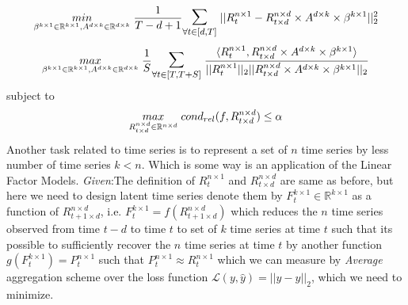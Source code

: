 \begin{equation} \label{lfm_loss}
\underset{\beta^{k \times 1}\in \mathbb{R}^{k\times 1}, A^{d\times k} \in \mathbb{R}^{d\times k}}{min}\hspace{1mm} \frac{1}{T-d+1} \mathlarger{\mathlarger{\sum}}_{\forall t\in [d,T]} \hspace{1mm} ||R^{n\times 1}_t-R^{n\times d}_{t\times d}\times A^{d\times k} \times \beta^{k \times 1}||_2^2
\end{equation}
\begin{equation} \label{lfm_reward}
\underset{\beta^{k \times 1}\in \mathbb{R}^{k\times 1}, A^{d\times k} \in \mathbb{R}^{d\times k}}{max}\hspace{1mm} \frac{1}{S} \mathlarger{\mathlarger{\sum}}_{\forall t\in [T,T+S]} \hspace{1mm} \frac{\langle R^{n\times 1}_t,R^{n\times d}_{t\times d}\times A^{d\times k} \times \beta^{k \times 1}\rangle}{||R^{n\times 1}_t||_2||R^{n\times d}_{t\times d}\times A^{d\times k} \times \beta^{k \times 1}||_2}
\end{equation}
subject to
\begin{equation} \label{lfm_cond}
\underset{R^{n\times d}_{t\times d} \in \mathbb{R}^{n\times d}}{max}\hspace{1mm} cond_{rel}(f,R^{n\times d}_{t\times d}) \le \alpha
\end{equation}
\newline
{}
Another task related to time series is to represent a set of $n$ time series by less number of time series $k<n$. Which is some way is an application of the Linear Factor Models.\newline
\textit{Given}:\newline The definition of $R^{n\times 1}_t$ and  $R^{n\times d}_{t\times d}$ are same as before, but here we need to design latent time series denote them by $F^{k\times 1}_t \in \mathbb{R}^{k\times 1}$ as a function of $R^{n\times d}_{t+1\times d}$, i.e. $F^{k\times 1}_t = f(R^{n\times d}_{t+1\times d})$ which reduces the $n$ time series observed from time $t-d$ to time $t$ to set of $k$ time series at time $t$ such that its possible to sufficiently recover the $n$ time series at time $t$ by another function $ g(F^{k\times 1}_t) = P^{n \times 1}_{t}$ such that $P^{n \times 1}_{t} \approx R^{n \times 1}_{t}$ which we can measure by \textit{Average} aggregation scheme over the loss function $\mathcal{L}(y,\hat{y}) = ||y-\hat{y}||_2$, which we need to minimize.

